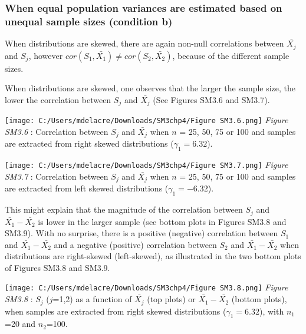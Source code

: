 \documentclass[
  english,
  man,mask,floatsintext]{apa6}
\begin{document}
\newpage

\hypertarget{when-equal-population-variances-are-estimated-based-on-unequal-sample-sizes-condition-b}{%
\subsubsection{When equal population variances are estimated based on unequal sample sizes (condition b)}\label{when-equal-population-variances-are-estimated-based-on-unequal-sample-sizes-condition-b}}

\setlength\parindent{24pt}When distributions are skewed, there are again non-null correlations between \(\bar{X_j}\) and \(S_j\), however \(cor(S_1,\bar{X_1}) \neq cor(S_2,\bar{X_2})\), because of the different sample sizes.

When distributions are skewed, one observes that the larger the sample size, the lower the correlation between \(S_j\) and \(\bar{X_j}\) (See Figures SM3.6 and SM3.7).

\texttt{[image: C:/Users/mdelacre/Downloads/SM3chp4/Figure SM3.6.png]}
\setlength\parindent{0pt}\emph{Figure SM3.6} : Correlation between \(S_j\) and \(\bar{X_j}\) when \(n\) = 25, 50, 75 or 100 and samples are extracted from right skewed distributions (\(\gamma_1 = 6.32\)).

\newpage

\texttt{[image: C:/Users/mdelacre/Downloads/SM3chp4/Figure SM3.7.png]}
\emph{Figure SM3.7} : Correlation between \(S_j\) and \(\bar{X_j}\) when \(n\) = 25, 50, 75 or 100 and samples are extracted from left skewed distributions (\(\gamma_1 = -6.32\)).

\newpage

\setlength\parindent{24pt}This might explain that the magnitude of the correlation between \(S_j\) and \(\bar{X_1}-\bar{X_2}\) is lower in the larger sample (see bottom plots in Figures SM3.8 and SM3.9). With no surprise, there is a positive (negative) correlation between \(S_1\) and \(\bar{X_1}-\bar{X_2}\) and a negative (positive) correlation between \(S_2\) and \(\bar{X_1}-\bar{X_2}\) when distributions are right-skewed (left-skewed), as illustrated in the two bottom plots of Figures SM3.8 and SM3.9.

\texttt{[image: C:/Users/mdelacre/Downloads/SM3chp4/Figure SM3.8.png]}
\setlength\parindent{0pt}\emph{Figure SM3.8} : \(S_j\) (\(j\)=1,2) as a function of \(\bar{X_j}\) (top plots) or \(\bar{X_1}-\bar{X_2}\) (bottom plots), when samples are extracted from right skewed distributions (\(\gamma_1 = 6.32\)), with \(n_1\)=20 and \(n_2\)=100.
\end{document}

